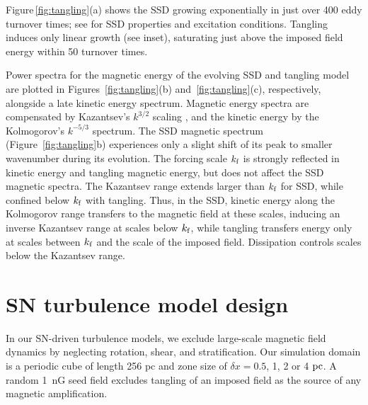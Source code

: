 \documentclass[preprint2]{aastex63}
\newcommand\kf{k_{\rm f} }
\newcommand\pc{~ {\rm pc}}
\begin{document}
 Figure\,\ref{fig:tangling}(a) shows the SSD growing exponentially in just over
 400 eddy turnover times; see \cite{ZRS83} for SSD properties and excitation
 conditions.
 Tangling induces only linear growth (see inset), saturating just above
 the imposed field energy within 50 turnover times.

 Power spectra for the magnetic energy of the evolving SSD and
 tangling model are plotted
 in Figures~\ref{fig:tangling}(b) and~\ref{fig:tangling}(c), respectively,
 alongside a late kinetic energy spectrum.
 Magnetic energy spectra are compensated by Kazantsev's $k^{3/2}$
 scaling \citep{Sch02,BS14}, and the kinetic energy by the
 Kolmogorov's $k^{-5/3}$ spectrum.
 The SSD magnetic spectrum (Figure~\ref{fig:tangling}b) experiences only a
 slight shift of its peak to smaller wavenumber during its evolution.
 The forcing scale $\kf$ is strongly reflected in kinetic energy and tangling 
 magnetic energy, but does not affect the SSD magnetic spectra.
 The Kazantsev range extends larger than $\kf$ for SSD, while
 confined below $\kf$ with tangling.
 Thus, in the SSD, kinetic energy along the Kolmogorov range transfers to
 the magnetic field at these scales, inducing an inverse Kazantsev range
 at scales below $\kf$, while tangling transfers energy only at scales between
 $\kf$ and the scale of the imposed field.
 Dissipation controls scales below the Kazantsev range.
 
\section{SN turbulence model design} \label{sec:model}

 In our SN-driven turbulence models, we exclude large-scale magnetic
 field dynamics by neglecting rotation, shear, and stratification. Our
 simulation domain is a periodic cube of length 256 pc and zone size
 of $\delta x=0.5$, 1, 2 or 4$\pc$.
 A random 1~nG seed field excludes tangling of an imposed field as the 
 source of any magnetic amplification.
\end{document}
